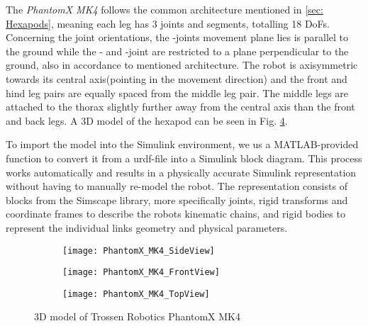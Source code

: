The \textit{PhantomX MK4} follows the common architecture mentioned in \ref{sec: Hexapods}, meaning each leg has 3 joints and segments, totalling 18 DoFs.
Concerning the joint orientations, the \textalpha-joints movement plane lies is parallel to the ground while the \textbeta- and \textgamma-joint are restricted to a plane perpendicular to the ground, also in accordance to mentioned architecture.
The robot is axisymmetric towards its central axis(pointing in the movement direction) and the front and hind leg pairs are equally spaced from the middle leg pair.
The middle legs are attached to the thorax slightly further away from the central axis than the front and back legs.
A 3D model of the hexapod can be seen in Fig. \ref{figure: PhantomX 3D model}.

To import the model into the Simulink environment, we us a MATLAB-provided function to convert it from a urdf-file into a Simulink block diagram.
This process works automatically and results in a physically accurate Simulink representation without having to manually re-model the robot.
The representation consists of blocks from the Simscape library, more specifically joints, rigid transforms and coordinate frames to describe the robots kinematic chains, and rigid bodies to represent the individual links geometry and physical parameters.

\begin{figure}[h]
	\begin{subfigure}{.5\textwidth} %
		\centering
		\texttt{[image: PhantomX\_MK4\_SideView]}  %
		\caption{}
		\label{figure: PhantomX Side View}
	\end{subfigure}
	\begin{subfigure}{.5\textwidth}
		\centering
		\texttt{[image: PhantomX\_MK4\_FrontView]}  
		\caption{}
		\label{figure: PhantomX Front View}
	\end{subfigure}
	
	\label{fig:fig}
	\begin{subfigure}{\textwidth}
		\centering
		\texttt{[image: PhantomX\_MK4\_TopView]}   %
		\caption{}
		\label{figure: PhantomX Top View}
	\end{subfigure}
	\caption[]{3D model of Trossen Robotics PhantomX MK4}
	\label{figure: PhantomX 3D model}
\end{figure}

